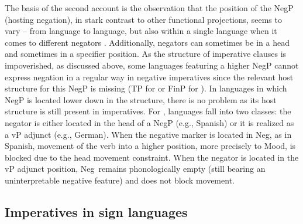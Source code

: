 The basis of the second account is the observation that the position of the NegP (hosting negation), in stark contrast to other functional projections, seems to vary -- from language to language, but also within a single language when it comes to different negators \citep{ouhalla1990sentential, ouhalla1991functional, zanuttini1991syntactic}. Additionally, negators can sometimes be in a head and sometimes in a specifier position. As the structure of imperative clauses is impoverished, as discussed above, some languages featuring a higher NegP cannot express negation in a regular way in negative imperatives since the relevant host structure for this NegP is missing (TP for \citealt{zanuttini1991syntactic} or FinP for \citealt{platzack1998subject}). In languages in which NegP is located lower down in the structure, there is no problem as its host structure is still present in imperatives. For \citet{zeijlstra2004sentential}, languages fall into two classes: the negator is either located in the head of a NegP (e.g., Spanish) or it is realized as a vP adjunct (e.g., German). When the negative marker is located in Neg\textdegree , as in Spanish, movement of the verb into a higher position, more precisely to Mood\textdegree , is blocked due to the head movement constraint. When the negator is located in the vP adjunct position, Neg\textdegree\ remains phonologically empty (still bearing an uninterpretable negative feature) and does not block movement. 

\subsection{Imperatives in sign languages}


